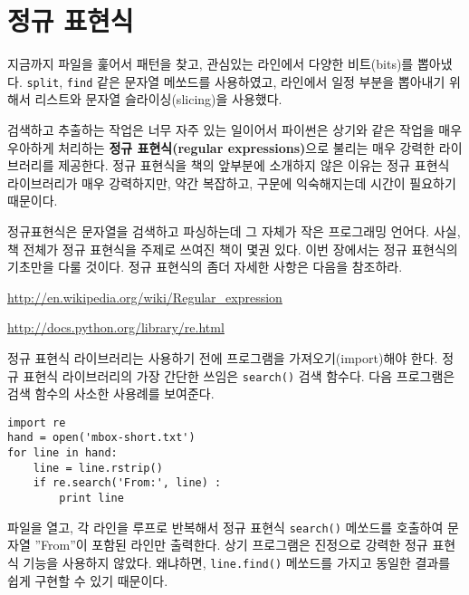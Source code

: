 
\chapter{정규 표현식}

지금까지 파일을 훑어서 패턴을 찾고, 관심있는 라인에서 다양한 비트(bits)를 뽑아냈다. 
{\tt split}, {\tt find} 같은 문자열 메쏘드를 사용하였고, 라인에서 일정 부분을 뽑아내기 위해서 리스트와 문자열 슬라이싱(slicing)을 사용했다.


검색하고 추출하는 작업은 너무 자주 있는 일이어서 파이썬은 상기와 같은 작업을 매우 우아하게 처리하는 {\bf 정규 표현식(regular expressions)}으로 불리는 매우 강력한 라이브러리를 제공한다.
정규 표현식을 책의 앞부분에 소개하지 않은 이유는 정규 표현식 라이브러리가 매우 강력하지만, 약간 복잡하고, 구문에 익숙해지는데 시간이 필요하기 때문이다.

정규표현식은 문자열을 검색하고 파싱하는데 그 자체가 작은 프로그래밍 언어다.
사실, 책 전체가 정규 표현식을 주제로 쓰여진 책이 몇권 있다.
이번 장에서는 정규 표현식의 기초만을 다룰 것이다.
정규 표현식의 좀더 자세한 사항은 다음을 참조하라.

\url{http://en.wikipedia.org/wiki/Regular_expression}

\url{http://docs.python.org/library/re.html}

정규 표현식 라이브러리는 사용하기 전에 프로그램을 가져오기(import)해야 한다.
정규 표현식 라이브러리의 가장 간단한 쓰임은  {\tt search()} 검색 함수다. 
다음 프로그램은 검색 함수의 사소한 사용례를 보여준다.


\beforeverb
\begin{verbatim}
import re
hand = open('mbox-short.txt')
for line in hand:
    line = line.rstrip()
    if re.search('From:', line) :
        print line
\end{verbatim}
\afterverb
%

파일을 열고, 각 라인을 루프로 반복해서 정규 표현식 {\tt search()} 메쏘드를 호출하여 문자열 ''From''이 포함된 라인만 출력한다.
상기 프로그램은 진정으로 강력한 정규 표현식 기능을 사용하지 않았다. 
왜냐하면, {\tt line.find()} 메쏘드를 가지고 동일한 결과를 쉽게 구현할 수 있기 때문이다.


